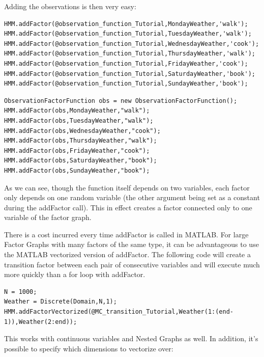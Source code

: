 \fi

Adding the observations is then very easy:

\ifmatlab
\begin{lstlisting}
HMM.addFactor(@observation_function_Tutorial,MondayWeather,'walk');
HMM.addFactor(@observation_function_Tutorial,TuesdayWeather,'walk');
HMM.addFactor(@observation_function_Tutorial,WednesdayWeather,'cook');
HMM.addFactor(@observation_function_Tutorial,ThursdayWeather,'walk');
HMM.addFactor(@observation_function_Tutorial,FridayWeather,'cook');
HMM.addFactor(@observation_function_Tutorial,SaturdayWeather,'book');
HMM.addFactor(@observation_function_Tutorial,SundayWeather,'book');
\end{lstlisting}
\fi

\ifjava

\begin{lstlisting}
ObservationFactorFunction obs = new ObservationFactorFunction();
HMM.addFactor(obs,MondayWeather,"walk");
HMM.addFactor(obs,TuesdayWeather,"walk");
HMM.addFactor(obs,WednesdayWeather,"cook");
HMM.addFactor(obs,ThursdayWeather,"walk");
HMM.addFactor(obs,FridayWeather,"cook");
HMM.addFactor(obs,SaturdayWeather,"book");
HMM.addFactor(obs,SundayWeather,"book");
\end{lstlisting}

\fi

As we can see, though the function itself depends on two variables, each factor only depends on one random variable (the other argument being set as a constant during the addFactor call). This in effect creates a factor connected only to one variable of the factor graph.

\ifmatlab

There is a cost incurred every time addFactor is called in MATLAB.  For large Factor Graphs with many factors of the same type, it can be advantageous to use the MATLAB vectorized version of addFactor.  The following code will create a transition factor between each pair of consecutive variables and will execute much more quickly than a for loop with addFactor.


\begin{lstlisting}
N = 1000;
Weather = Discrete(Domain,N,1);
HMM.addFactorVectorized(@MC_transition_Tutorial,Weather(1:(end-1)),Weather(2:end));
\end{lstlisting}

This works with continuous variables and Nested Graphs as well.  In addition, it's possible to specify which dimensions to vectorize over:


